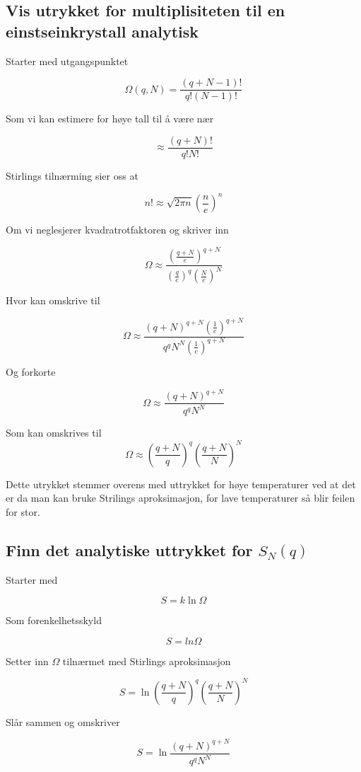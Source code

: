 \documentclass[ reprint, amsmath,amssymb, aps]{revtex4-2}
\begin{document}
\subsection*{Vis utrykket for multiplisiteten til en einstseinkrystall analytisk}

Starter med utgangspunktet

$$ \Omega(q, N) = \frac{( q + N -1)!}{q!(N-1)!} $$

Som vi kan estimere for høye tall til å være nær

$$\approx \frac{( q + N)!}{q!N!}$$

Stirlings tilnærming sier oss at

$$n! \approx \sqrt{2\pi n} \left ( \frac{n}{e} \right ) ^n$$

Om vi neglesjerer kvadratrotfaktoren og skriver inn

$$\Omega \approx \frac{\left ( \frac{q+N}{e} \right ) ^{q+N}}{\left ( \frac{q}{e} \right ) ^q  \left ( \frac{N}{e} \right ) ^N} $$

Hvor kan omskrive til

$$\Omega \approx \frac{\left ( q+N \right ) ^{q+N} \left( \frac{1}{e} \right )^{q+N}}{ q^q   N^N \left( \frac{1}{e} \right )^{q+N}}$$

Og forkorte

$$\Omega \approx \frac{ \left ( q+N \right ) ^{q+N}}{q^q   N^N }$$

Som kan omskrives til
$$\Omega \approx \left ( \frac{q+N}{q}\right )^q \left ( \frac{q+N}{N}\right )^N$$

Dette utrykket stemmer overens med uttrykket for høye temperaturer ved at det er da man kan bruke Strilings aproksimasjon, for lave temperaturer så blir feilen for stor.

\subsection*{Finn det analytiske uttrykket for $S_N(q)$}

Starter med 

$$ S = k \ln{\Omega}$$

Som forenkelhetsskyld

$$ S = ln{\Omega}$$

Setter inn $\Omega$ tilnærmet med Stirlings aproksimasjon

$$ S = \ln{\left ( \frac{q+N}{q}\right )^q \left ( \frac{q+N}{N}\right )^N} $$

Slår sammen og omskriver

$$ S = \ln{\frac{ \left ( q+N \right ) ^{q+N}}{q^q   N^N }}$$
\end{document}
